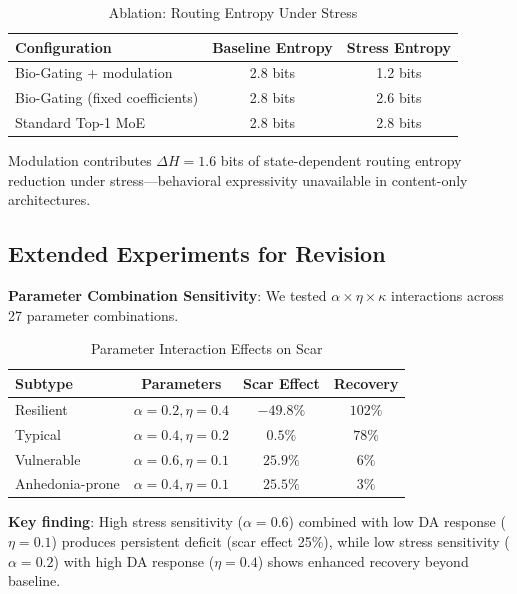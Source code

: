 \documentclass[preprint,12pt]{elsarticle}
\begin{document}
\begin{table}[htbp]
\centering
\caption{Ablation: Routing Entropy Under Stress}
\label{tab:ablation}
\begin{tabular}{lcc}
\toprule
\textbf{Configuration} & \textbf{Baseline Entropy} & \textbf{Stress Entropy} \\
\midrule
Bio-Gating + modulation & 2.8 bits & 1.2 bits \\
Bio-Gating (fixed coefficients) & 2.8 bits & 2.6 bits \\
Standard Top-1 MoE & 2.8 bits & 2.8 bits \\
\bottomrule
\end{tabular}
\end{table}

Modulation contributes $\Delta H = 1.6$ bits of state-dependent routing entropy reduction under stress---behavioral expressivity unavailable in content-only architectures.

\subsection{Extended Experiments for Revision}

\textbf{Parameter Combination Sensitivity}: We tested $\alpha \times \eta \times \kappa$ interactions across 27 parameter combinations.

\begin{table}[htbp]
\centering
\caption{Parameter Interaction Effects on Scar}
\label{tab:param_interaction}
\begin{tabular}{lccc}
\toprule
\textbf{Subtype} & \textbf{Parameters} & \textbf{Scar Effect} & \textbf{Recovery} \\
\midrule
Resilient & $\alpha=0.2, \eta=0.4$ & $-49.8\%$ & $102\%$ \\
Typical & $\alpha=0.4, \eta=0.2$ & $0.5\%$ & $78\%$ \\
Vulnerable & $\alpha=0.6, \eta=0.1$ & $25.9\%$ & $6\%$ \\
Anhedonia-prone & $\alpha=0.4, \eta=0.1$ & $25.5\%$ & $3\%$ \\
\bottomrule
\end{tabular}
\end{table}

\textbf{Key finding}: High stress sensitivity ($\alpha=0.6$) combined with low DA response ($\eta=0.1$) produces persistent deficit (scar effect 25\%), while low stress sensitivity ($\alpha=0.2$) with high DA response ($\eta=0.4$) shows enhanced recovery beyond baseline.
\end{document}
